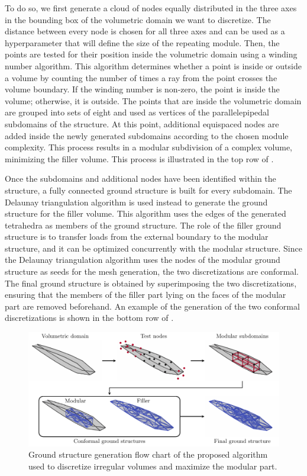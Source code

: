 To do so, we first generate a cloud of nodes equally distributed in the three axes in the bounding box of the volumetric domain we want to discretize. The distance between every node is chosen for all three axes and can be used as a hyperparameter that will define the size of the repeating module. Then, the points are tested for their position inside the volumetric domain using a winding number algorithm. This algorithm determines whether a point is inside or outside a volume by counting the number of times a ray from the point crosses the volume boundary. If the winding number is non-zero, the point is inside the volume; otherwise, it is outside. The points that are inside the volumetric domain are grouped into sets of eight and used as vertices of the parallelepipedal subdomains of the structure. At this point, additional equispaced nodes are added inside the newly generated subdomains according to the chosen module complexity. This process results in a modular subdivision of a complex volume, minimizing the filler volume. This process is illustrated in the top row of .

Once the subdomains and additional nodes have been identified within the structure, a fully connected ground structure is built for every subdomain. The Delaunay triangulation algorithm is used instead to generate the ground structure for the filler volume. This algorithm uses the edges of the generated tetrahedra as members of the ground structure. The role of the filler ground structure is to transfer loads from the external boundary to the modular structure, and it can be optimized concurrently with the modular structure. Since the Delaunay triangulation algorithm uses the nodes of the modular ground structure as seeds for the mesh generation, the two discretizations are conformal. The final ground structure is obtained by superimposing the two discretizations, ensuring that the members of the filler part lying on the faces of the modular part are removed beforehand. An example of the generation of the two conformal discretizations is shown in the bottom row of .

\begin{figure}
    \centering
    \includegraphics[width=\linewidth]{figures/07_aeronautic/00_naca_howtomesh/MESH.pdf}
     \caption{Ground structure generation flow chart of the proposed algorithm used to discretize irregular volumes and maximize the modular part.}
    \label{fig:07_howto}
\end{figure}

